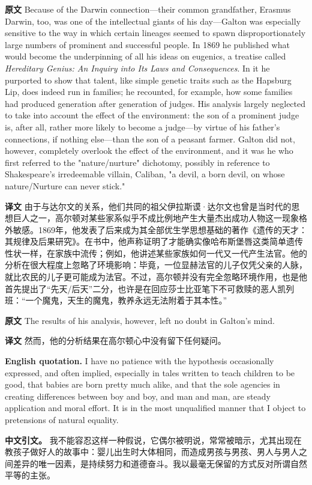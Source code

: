 \documentclass[UTF8,zihao=-4]{ctexart}
\newcommand{\BodyFont}{\fontsize{10.5pt}{15.5pt}\selectfont}
\renewenvironment{quote}{\par\noindent\begingroup\BodyFont}{\par\endgroup}
\begin{document}
\begin{quote}
\noindent\textbf{原文} Because of the Darwin connection---their common grandfather, Erasmus Darwin, too, was one of the intellectual giants of his day---Galton was especially sensitive to the way in which certain lineages seemed to spawn disproportionately large numbers of prominent and successful people. In 1869 he published what would become the underpinning of all his ideas on eugenics, a treatise called \emph{Hereditary Genius: An Inquiry into Its Laws and Consequences}. In it he purported to show that talent, like simple genetic traits such as the Hapsburg Lip, does indeed run in families; he recounted, for example, how some families had produced generation after generation of judges. His analysis largely neglected to take into account the effect of the environment: the son of a prominent judge is, after all, rather more likely to become a judge---by virtue of his father's connections, if nothing else---than the son of a peasant farmer. Galton did not, however, completely overlook the effect of the environment, and it was he who first referred to the "nature/nurture" dichotomy, possibly in reference to Shakespeare's irredeemable villain, Caliban, "a devil, a born devil, on whose nature/Nurture can never stick."

\smallskip
\noindent\textbf{译文} 由于与达尔文的关系，他们共同的祖父伊拉斯谟·达尔文也曾是当时代的思想巨人之一，高尔顿对某些家系似乎不成比例地产生大量杰出成功人物这一现象格外敏感。1869年，他发表了后来成为其全部优生学思想基础的著作《遗传的天才：其规律及后果研究》。在书中，他声称证明了才能确实像哈布斯堡唇这类简单遗传性状一样，在家族中流传；例如，他讲述某些家族如何一代又一代产生法官。他的分析在很大程度上忽略了环境影响：毕竟，一位显赫法官的儿子仅凭父亲的人脉，就比农民的儿子更可能成为法官。不过，高尔顿并没有完全忽略环境作用，也是他首先提出了“先天/后天”二分，也许是在回应莎士比亚笔下不可救赎的恶人凯列班：“一个魔鬼，天生的魔鬼，教养永远无法附着于其本性。”
\end{quote}

\begin{quote}
\noindent\textbf{原文} The results of his analysis, however, left no doubt in Galton's mind.

\smallskip
\noindent\textbf{译文} 然而，他的分析结果在高尔顿心中没有留下任何疑问。
\end{quote}

\begin{quote}
\noindent\textbf{English quotation.} I have no patience with the hypothesis occasionally expressed, and often implied, especially in tales written to teach children to be good, that babies are born pretty much alike, and that the sole agencies in creating differences between boy and boy, and man and man, are steady application and moral effort. It is in the most unqualified manner that I object to pretensions of natural equality.

\smallskip
\noindent\textbf{中文引文。} 我不能容忍这样一种假说，它偶尔被明说，常常被暗示，尤其出现在教孩子做好人的故事中：婴儿出生时大体相同，而造成男孩与男孩、男人与男人之间差异的唯一因素，是持续努力和道德奋斗。我以最毫无保留的方式反对所谓自然平等的主张。
\end{quote}
\end{document}
